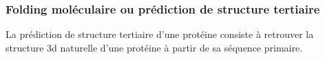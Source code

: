 



\subsubsection{Folding moléculaire ou prédiction de structure tertiaire} 

La prédiction de structure tertiaire d'une protéine consiste à retrouver la structure 3d naturelle d'une protéine à partir de sa séquence primaire. 

